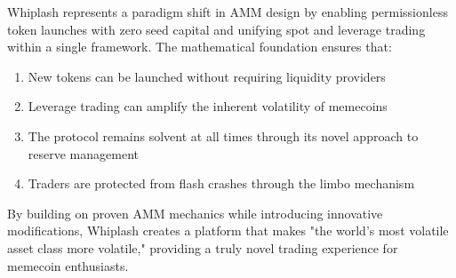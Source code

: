 \documentclass[11pt]{article}
\begin{document}
Whiplash represents a paradigm shift in AMM design by enabling permissionless token launches with zero seed capital and unifying spot and leverage trading within a single framework. The mathematical foundation ensures that:

\begin{enumerate}
    \item New tokens can be launched without requiring liquidity providers
    \item Leverage trading can amplify the inherent volatility of memecoins
    \item The protocol remains solvent at all times through its novel approach to reserve management
    \item Traders are protected from flash crashes through the limbo mechanism
\end{enumerate}

By building on proven AMM mechanics while introducing innovative modifications, Whiplash creates a platform that makes "the world's most volatile asset class more volatile," providing a truly novel trading experience for memecoin enthusiasts.
\end{document}
